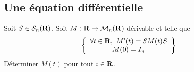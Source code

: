 \subsection{Une équation différentielle}
\begin{exercice}
    Soit $S\in\mathcal S_n(\operatorname{\mathbf{R}})$.
    Soit $M:\operatorname{\mathbf{R}}\to\mathcal M_n(\operatorname{\mathbf{R}})$ dérivable et telle que 
    \[
        \left\lbrace \begin{array}{c} \forall t\in\operatorname{\mathbf{R}},\ M'(t)=SM(t)S\\ M(0) = I_n\end{array}\right\rbrace    
    \]
    Déterminer $M(t)$ pour tout $t\in\operatorname{\mathbf{R}}$.
\end{exercice}

\begin{correction}
    [À rédiger]
\end{correction}